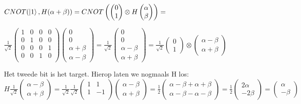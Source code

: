 \documentclass[../../main.tex]{subfiles}
\begin{document}
$
CNOT(\ket{1},H(\alpha+\beta))=CNOT
\begin{pmatrix}
\begin{pmatrix}
0\\
1
\end{pmatrix}
\otimes
H\begin{pmatrix}
\alpha\\
\beta
\end{pmatrix}
\end{pmatrix}
=
$

$
\frac{1}{\sqrt{2}}
\begin{pmatrix}
1&0&0&0\\
0&1&0&0\\
0&0&0&1\\
0&0&1&0\\
\end{pmatrix}
\begin{pmatrix}
0\\
0\\
\alpha+\beta\\
\alpha-\beta
\end{pmatrix}
=
\frac{1}{\sqrt{2}}
\begin{pmatrix}
0\\
0\\
\alpha-\beta\\
\alpha+\beta
\end{pmatrix}
=
\frac{1}{\sqrt{2}}
\begin{pmatrix}
0\\
1
\end{pmatrix}
\otimes
\begin{pmatrix}
\alpha-\beta\\
\alpha+\beta
\end{pmatrix}
$

\vspace{1cm}
Het tweede bit is het target. Hierop laten we nogmaals H los:
$
H\frac{1}{\sqrt{2}}
\begin{pmatrix}
\alpha-\beta\\
\alpha+\beta
\end{pmatrix}
=
\tfrac{1}{\sqrt{2}}
\tfrac{1}{\sqrt{2}}
\begin{pmatrix}
1&1\\
1&-1\\
\end{pmatrix}
\begin{pmatrix}
\alpha-\beta\\
\alpha+\beta
\end{pmatrix}
=
\tfrac{1}{2}
\begin{pmatrix}
\alpha-\beta+\alpha+\beta\\
\alpha-\beta-\alpha-\beta
\end{pmatrix}
=
\tfrac{1}{2}
\begin{pmatrix}
2\alpha\\
-2\beta
\end{pmatrix}
=
\begin{pmatrix}
\alpha\\
-\beta
\end{pmatrix}
$
\end{document}
